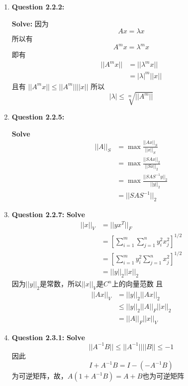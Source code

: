 \documentclass[UTF8]{uofa-eng-assignment}
\begin{document}
\maketitle

\begin{enumerate}

\item \textbf{Question 2.2.2:}

\textbf{Solve:}
因为
$$Ax=\lambda x$$
所以有
$$A^mx=\lambda^m x$$
即有
$$
\begin{aligned}
||A^mx||&=||\lambda^m x||\\
&=|\lambda|^m||x||
\end{aligned}
$$
且有
$||A^mx||\leq||A^m|| ||x||$
所以
$$
|\lambda|\leq \sqrt[m]{||A^m||}
$$
\item \textbf{Question 2.2.5:}

\textbf{Solve}
$$
\begin{aligned}
||A||_S&=\max \frac{||Ax||_S}{||x||_S}\\
&=\max \frac{||SAx||_2}{||Sx||_2}\\
&=\max \frac{||SAS^{-1}y||_2}{||y||_2}\\
&=||SAS^{-1}||_2
\end{aligned}
$$

\item \textbf{Question 2.2.7:}
\textbf{Solve}
$$
\begin{aligned}
    ||x||_V&=||yx^T||_F\\
    &=[\sum_{i=1}^m\sum_{j=1}^n y_i^2x_j^2]^{1/2}\\
    &=[\sum_{i=1}^m y_i^2\sum_{j=1}^n x_j^2]^{1/2}\\
    &=||y||_2||x||_2
\end{aligned}
$$
因为$||y||_2$是常数，所以$||x||_V$是$C^n$上的向量范数
且
$$
\begin{aligned}
    ||Ax||_V&=||y||_2||Ax||_2\\
    &\leq||y||_2||A||_F||x||_2\\
    &=||A||_F||x||_V    
\end{aligned}
$$
\item \textbf{Question 2.3.1:}
\textbf{Solve}
$$
||A^{-1}B||\leq||A^{-1}||||B||\leq-1
$$
因此
$$I+A^{-1}B=I-(-A^{-1}B)$$
为可逆矩阵，故，$A(1+A^{-1}B)=A+B$也为可逆矩阵
\end{enumerate}
\end{document}
